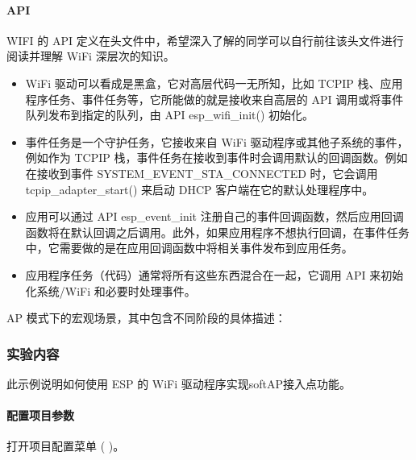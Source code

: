 \documentclass[a4paper,12pt,english]{sphinxmanual}
\begin{document}
{{\paragraph{API}
\label{\detokenize{exp-esp32/wifi/ap:api}}
\sphinxAtStartPar
WIFI 的 API 定义在头文件中，希望深入了解的同学可以自行前往该头文件进行阅读并理解 WiFi 深层次的知识。
\begin{itemize}
\item {} 
\sphinxAtStartPar
WiFi 驱动可以看成是黑盒，它对高层代码一无所知，比如 TCPIP 栈、应用程序任务、事件任务等，它所能做的就是接收来自高层的 API 调用或将事件队列发布到指定的队列，由 API esp\_wifi\_init() 初始化。

\item {} 
\sphinxAtStartPar
事件任务是一个守护任务，它接收来自 WiFi 驱动程序或其他子系统的事件，例如作为 TCPIP 栈，事件任务在接收到事件时会调用默认的回调函数。例如在接收到事件 SYSTEM\_EVENT\_STA\_CONNECTED 时，它会调用 tcpip\_adapter\_start() 来启动 DHCP 客户端在它的默认处理程序中。

\item {} 
\sphinxAtStartPar
应用可以通过 API esp\_event\_init 注册自己的事件回调函数，然后应用回调函数将在默认回调之后调用。此外，如果应用程序不想执行回调，在事件任务中，它需要做的是在应用回调函数中将相关事件发布到应用任务。

\item {} 
\sphinxAtStartPar
应用程序任务（代码）通常将所有这些东西混合在一起，它调用 API 来初始化系统/WiFi 和必要时处理事件。

\end{itemize}

\sphinxAtStartPar
AP 模式下的宏观场景，其中包含不同阶段的具体描述：

\sphinxAtStartPar
{}


\subsubsection{实验内容}
\label{\detokenize{exp-esp32/wifi/ap:id3}}
\sphinxAtStartPar
此示例说明如何使用 ESP 的 Wi\sphinxhyphen{}Fi 驱动程序实现softAP接入点功能。


\paragraph{配置项目参数}
\label{\detokenize{exp-esp32/wifi/ap:id4}}
\sphinxAtStartPar
打开项目配置菜单 ( )。

}}
\end{document}
